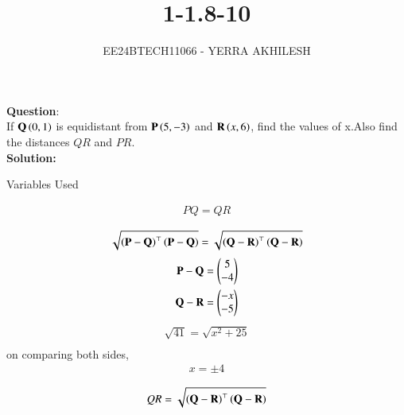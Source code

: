 \documentclass[journal]{IEEEtran}
\begin{document}

\vspace{3cm}

\title{1-1.8-10}
\author{EE24BTECH11066 - YERRA AKHILESH
}
{\let\newpage\relax\maketitle}

\renewcommand{\thefigure}{\theenumi}
\renewcommand{\thetable}{\theenumi}
\setlength{\intextsep}{10pt} %


\renewcommand{\thetable}{\theenumi}
\textbf{Question}:\\
If $\mathbf{Q}\left(0, 1\right)$ is equidistant from $\mathbf{P}\left(5, -3\right)$ and $\mathbf{R}\left(x, 6\right)$, find the values of x.Also find the distances $QR$ and $PR$.
\\
\textbf{Solution: }
\begin{table}[h!]    
  \centering
  
  \caption{Variables Used}
  \label{tab1-1.8-10}
\end{table}
\begin{align}
    PQ = QR\\
\end{align}  
\begin{align}
    \sqrt{\left(\mathbf{P}-\mathbf{Q}\right)^\top\left(\mathbf{P}-\mathbf{Q}\right)}=\sqrt{\left(\mathbf{Q}-\mathbf{R}\right)^\top\left(\mathbf{Q}-\mathbf{R}\right)}\\
\end{align}
\begin{align}
    \mathbf{P}-\mathbf{Q}=\begin{pmatrix}5\\-4\end{pmatrix}\\
    \mathbf{Q}-\mathbf{R}=\begin{pmatrix}-x\\-5\end{pmatrix}\\
\end{align}
\begin{align}    
    \sqrt{41}=\sqrt{x^2+25}\\
\end{align}
on comparing both sides,
\begin{align}
    x=\pm{4}\\
\end{align}
\begin{align}
    QR=\sqrt{\left(\mathbf{Q}-\mathbf{R}\right)^\top\left(\mathbf{Q}-\mathbf{R}\right)}\\
\end{align}
\end{document}
